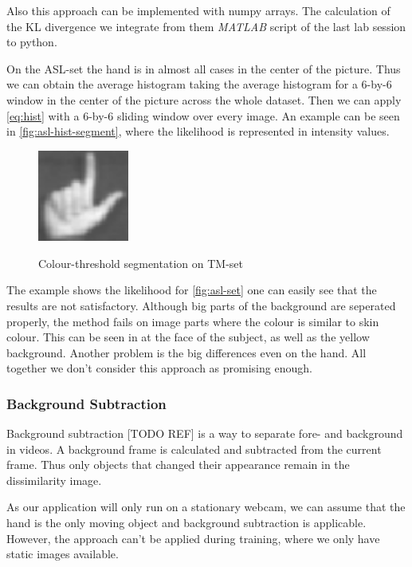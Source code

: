 \documentclass[letterpaper, 10 pt, conference]{ieeeconf}  %
\begin{document}
Also this approach can be implemented with numpy arrays. The calculation of the KL divergence we integrate from them \textit{MATLAB} script of the last lab session to python.

On the ASL-set the hand is in almost all cases in the center of the picture. Thus we can obtain the average histogram taking the average histogram for a 6-by-6 window in the center of the picture across the whole dataset. Then we can apply \autoref{eq:hist} with a 6-by-6 sliding window over every image. An example can be seen in \autoref{fig:asl-hist-segment}, where the likelihood is represented in intensity values.

\begin{figure}
\centering
\includegraphics[height=3cm]{tm-segment}
\label{fig:tm-segment}
\caption{Colour-threshold segmentation on TM-set}
\end{figure}

The example shows the likelihood for \autoref{fig:asl-set} one can easily see that the results are not satisfactory. Although big parts of the background are seperated properly, the method fails on image parts where the colour is similar to skin colour. This can be seen in at the face of the subject, as well as the yellow background. Another problem is the big differences even on the hand. All together we don't consider this approach as promising enough.

\subsubsection{Background Subtraction}

Background subtraction [TODO REF] is a way to separate fore- and background in videos. A background frame is calculated and subtracted from the current frame. Thus only objects that changed their appearance remain in the dissimilarity image.

As our application will only run on a stationary webcam, we can assume that the hand is the only moving object and background subtraction is applicable. However, the approach can't be applied during training, where we only have static images available.
\end{document}
